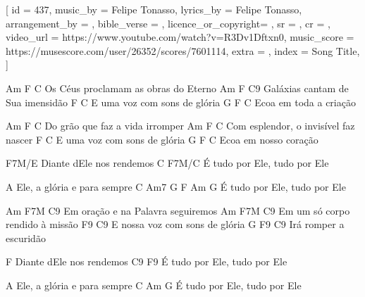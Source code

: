 [
    id                  = {437},
    music_by            = {Felipe Tonasso}, %
    lyrics_by           = {Felipe Tonasso}, %
    arrangement_by      = {}, %
    bible_verse         = {},
    licence_or_copyright= {},
    sr                  = {},
    cr                  = {},
    video_url           = {https://www.youtube.com/watch?v=R3Dv1Dftxn0}, %
    music_score         = {https://musescore.com/user/26352/scores/7601114},
    extra               = {},
    index               = {Song Title},
]

\beginverse
             Am        F             C 
  Os Céus proclamam as obras do Eterno
           Am        F            C9
  Galáxias cantam de Sua imensidão
        F                C
  E uma voz com sons de glória
          G      F  C
  Ecoa em toda a criação

\endverse

\beginverse
              Am    F            C
  Do grão que faz a vida irromper
            Am         F               C
  Com esplendor, o invisível faz nascer
      F                 C
  E uma voz com sons de glória
          G     F  C
  Ecoa em nosso coração         
\endverse

\beginverse
F7M/E
  Diante dEle nos rendemos
    C                        F7M/C 
  É tudo por Ele, tudo por Ele

  A Ele, a glória e para sempre
    C             Am7      G   F  Am  G
  É tudo por Ele, tudo por Ele
\endverse

\beginverse
        Am         F7M            C9
  Em oração e na Palavra seguiremos
           Am       F7M         C9
  Em um só corpo rendido à missão
           F9               C9
  E nossa voz com sons de glória
          G    F9    C9 
  Irá romper a escuridão

\endverse

\beginverse
F
  Diante dEle nos rendemos
    C9                       F9 
  É tudo por Ele, tudo por Ele

  A Ele, a glória e para sempre
    C             Am      G   
  É tudo por Ele, tudo por Ele
  
